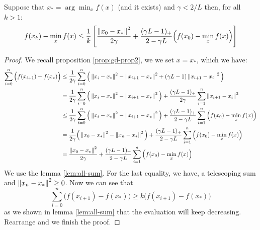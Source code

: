 \begin{theorem}
    Suppose that $x_{*} = \arg\min_{x} f(x)$ (and it exists) and $\gamma < 2/L$ then, for all $k>1$:
    \begin{equation*}
        f(x_k) - \min_{x} f(x) \le \frac{1}{k}\left[ \frac{\left\lVert x_0- x_*\right\rVert^2}{2\gamma} + \frac{(\gamma L - 1)_+}{2-\gamma L} \Big( f(x_0) - \min_{x} f(x) \Big)  \right]
    \end{equation*}
\end{theorem}
\begin{proof}
    We recall proposition \ref{prop:gd-prop2}, we we set $x = x_*$, which we have:
    \begin{equation*}
    \begin{aligned}
        \sum^n_{i=0}\Big(f(x_{i+1})-f(x_*)\Big) &\le \frac{1}{2\gamma}\sum^n_{i=0}\Big(\left\lVert x_i - x_*\right\rVert^2 - \left\lVert x_{i+1} - x_*\right\rVert^2 + (\gamma L - 1)\left\lVert x_{i+1} - x_i\right\rVert^2\Big) \\
        &= \frac{1}{2\gamma}\sum^n_{i=0} \Big(\left\lVert x_i - x_*\right\rVert^2 - \left\lVert x_{i+1} - x_*\right\rVert^2\Big) + \frac{(\gamma L - 1)_+}{2\gamma}\sum^n_{i=1}\left\lVert x_{i+1} - x_i\right\rVert^2 \\
        &\le \frac{1}{2\gamma}\sum^n_{i=0} \Big(\left\lVert x_i - x_*\right\rVert^2 - \left\lVert x_{i+1} - x_*\right\rVert^2\Big) + \frac{(\gamma L - 1)_+}{2-\gamma L}\sum^n_{i=1} \Big( f(x_0) - \min_{x} f(x) \Big) \\
        &= \frac{1}{2\gamma}\Big(\left\lVert x_0 - x_*\right\rVert^2 - \left\lVert x_n - x_*\right\rVert^2\Big) + \frac{(\gamma L - 1)_+}{2-\gamma L}\sum^n_{i=1} \Big( f(x_0) - \min_{x} f(x) \Big) \\
        &= \frac{\left\lVert x_0 - x_*\right\rVert^2}{2\gamma} + \frac{(\gamma L - 1)_+}{2-\gamma L}\sum^n_{i=1} \Big( f(x_0) - \min_{x} f(x) \Big) \\
    \end{aligned}
    \end{equation*}
    We use the lemma \ref{lem:all-sum}. For the last equality, we have, a telescoping sum and $\left\lVert x_n - x_*\right\rVert^2 \ge 0$. Now we can see that 
    \begin{equation*}
        \sum^n_{i=0}\Big(f(x_{i+1})-f(x_*)\Big) \ge k\Big(f(x_{i+1})-f(x_*)\Big)
    \end{equation*}
    as we shown in lemma \ref{lem:all-sum} that the evaluation will keep decreasing. 
    Rearrange and we finish the proof.
\end{proof}

